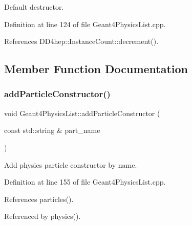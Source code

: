 Default destructor. 



Definition at line 124 of file Geant4\+Physics\+List.\+cpp.



References D\+D4hep\+::\+Instance\+Count\+::decrement().



\subsection{Member Function Documentation}
\hypertarget{class_d_d4hep_1_1_simulation_1_1_geant4_physics_list_ac4d76361cc1b439b42dc144a1e7fa988}{}\label{class_d_d4hep_1_1_simulation_1_1_geant4_physics_list_ac4d76361cc1b439b42dc144a1e7fa988} 
\subsubsection{\texorpdfstring{add\+Particle\+Constructor()}{addParticleConstructor()}}
{\footnotesize\ttfamily void Geant4\+Physics\+List\+::add\+Particle\+Constructor (\begin{DoxyParamCaption}\item[{const std\+::string \&}]{part\+\_\+name }\end{DoxyParamCaption})}



Add physics particle constructor by name. 



Definition at line 155 of file Geant4\+Physics\+List.\+cpp.



References particles().



Referenced by physics().

\hypertarget{class_d_d4hep_1_1_simulation_1_1_geant4_physics_list_a8c689c3ac8a923ff713c4389b5b502b4}{}\label{class_d_d4hep_1_1_simulation_1_1_geant4_physics_list_a8c689c3ac8a923ff713c4389b5b502b4} 
